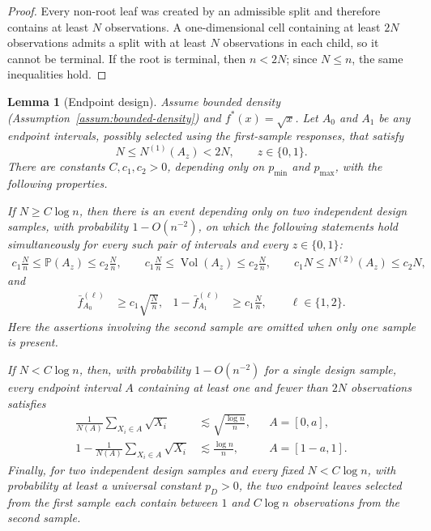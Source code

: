 \documentclass[11pt]{article}
\theoremstyle{plain}
\newtheorem{lemma}[theorem]{Lemma}
\theoremstyle{definition}
\theoremstyle{remark}
\theoremstyle{plain}
\renewcommand{\P}{\mathbb{P}}
\DeclareMathOperator{\Vol}{Vol}
\newcommand{\1}{\mathbbm{1}}
\begin{document}
\begin{proof}
Every non-root leaf was created by an admissible split and therefore contains
at least $N$ observations. A one-dimensional cell containing at least $2N$
observations admits a split with at least $N$ observations in each child, so
it cannot be terminal. If the root is terminal, then $n<2N$; since
$N\le n$, the same inequalities hold.
\end{proof}

\begin{lemma}[Endpoint design]
\label{lem:mls-endpoint-design}
Assume bounded density (Assumption~\ref{assum:bounded-density}) and
$f^*(x)=\sqrt{x}$. Let $A_0$ and $A_1$ be
any endpoint intervals, possibly selected using the first-sample responses,
that satisfy
\[
 N\le N^{(1)}(A_z)<2N,\qquad z\in\{0,1\}.
\]
There are constants $C,c_1,c_2>0$, depending only on
$p_{\min}$ and $p_{\max}$, with the following properties.

If $N\ge C\log n$, then there is an event depending only on two independent
design samples, with probability $1-O(n^{-2})$, on which the following
statements hold simultaneously for every such pair of intervals and every
$z\in\{0,1\}$:
\begin{align}
 c_1\frac{N}{n}
 \le \P(A_z)
 \le c_2\frac{N}{n},
 \qquad
 c_1\frac{N}{n}
 \le \Vol(A_z)
 \le c_2\frac{N}{n},
 \qquad
 c_1N
 \le N^{(2)}(A_z)
 \le c_2N,
 \label{eq:endpoint-design-counts}
\end{align}
and
\begin{align}
 \bar f_{A_0}^{(\ell)}
 &\ge c_1\sqrt{\frac{N}{n}},
 &
 1-\bar f_{A_1}^{(\ell)}
 &\ge c_1\frac{N}{n},
 \qquad \ell\in\{1,2\}.
 \label{eq:endpoint-design-biases}
\end{align}
Here the assertions involving the second sample are omitted when only one
sample is present.

If $N<C\log n$, then, with probability $1-O(n^{-2})$ for a single design
sample, every endpoint interval $A$ containing at least one and fewer than
$2N$ observations
satisfies
\begin{align}
 \frac{1}{N(A)}\sum_{X_i\in A}\sqrt{X_i}
 &\lesssim \sqrt{\frac{\log n}{n}},
 && A=[0,a],
 \label{eq:small-left-signal}\\
 1-\frac{1}{N(A)}\sum_{X_i\in A}\sqrt{X_i}
 &\lesssim \frac{\log n}{n},
 && A=[1-a,1].
 \label{eq:small-right-signal}
\end{align}
Finally, for two independent design samples and every fixed
$N<C\log n$, with probability at least a universal constant $p_D>0$,
the two endpoint leaves selected from the first sample each contain between
$1$ and $C\log n$ observations from the second sample.
\end{lemma}
\end{document}

